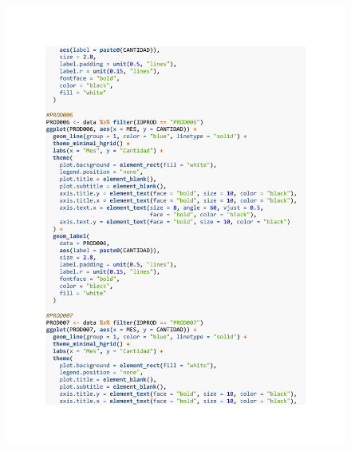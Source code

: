 \begin{figure}[h!]
        \begin{tcolorbox}[colback=white, colframe=black, boxrule=1.5pt, sharp corners=all]
            {\includegraphics[width=\linewidth, height=22cm, trim=2.5cm 2.5cm 2.5cm 2.5cm, clip]{images/script9.pdf}}
        \end{tcolorbox}
\end{figure}

